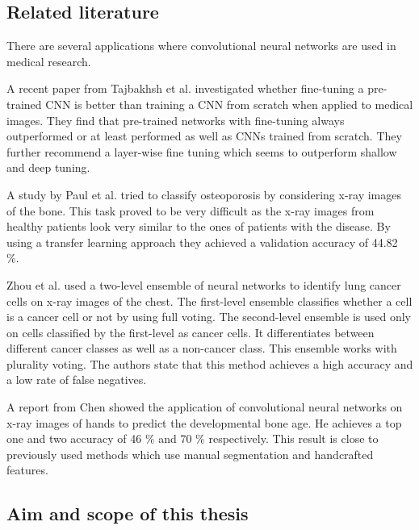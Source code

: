 \documentclass[12pt]{article}
\begin{document}
\subsection{Related literature}


There are several applications where convolutional neural networks are used in medical research.

A recent paper from Tajbakhsh et al. \cite{tajbakhsh_2017} investigated whether fine-tuning a pre-trained CNN is better than training a CNN from scratch when applied to medical images. They find that pre-trained networks with fine-tuning always outperformed or at least performed as well as CNNs trained from scratch. They further recommend a layer-wise fine tuning which seems to outperform shallow and deep tuning.

A study by Paul et al. \cite{paul_2017} tried to classify osteoporosis by considering x-ray images of the bone. This task proved to be very difficult as the x-ray images from healthy patients look very similar to the ones of patients with the disease. By using a transfer learning approach they achieved a validation accuracy of 44.82 \%.

Zhou et al. \cite{zhou_2002} used a two-level ensemble of neural networks to identify lung cancer cells on x-ray images of the chest. The first-level ensemble classifies whether a cell is a cancer cell or not by using full voting. The second-level ensemble is used only on cells classified by the first-level as cancer cells. It differentiates between different cancer classes as well as a non-cancer class. This ensemble works with plurality voting. The authors state that this method achieves a high accuracy and a low rate of false negatives.

A report from Chen \cite{chen_2016} showed the application of convolutional neural networks on x-ray images of hands to predict the developmental bone age. He achieves a top one and two accuracy of 46 \% and 70 \% respectively. This result is close to previously used methods which use manual segmentation and handcrafted features.






\subsection{Aim and scope of this thesis}
\end{document}
